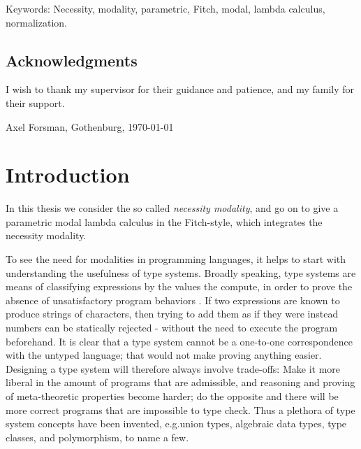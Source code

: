 \documentclass[12pt,twoside,openright]{report}
\numberwithin{equation}{chapter}
\numberwithin{figure}{chapter}
\numberwithin{table}{chapter}
\theoremstyle{definition}\newtheorem{definition}{Definition}
\begin{document}
\vfill
Keywords: Necessity, modality, parametric, Fitch, modal, lambda calculus, normalization.

\newpage
\thispagestyle{empty}
\mbox{}

\newpage
\thispagestyle{plain}
\section*{Acknowledgments}

I wish to thank my supervisor for their guidance and patience,
and my family for their support.

\vspace{1.5cm}\hfill
Axel Forsman, Gothenburg, \today

\newpage
\thispagestyle{empty}
\mbox{}

\newpage
\tableofcontents

\cleardoublepage
{}
\listoffigures

\cleardoublepage
\setcounter{page}{1}

\chapter{Introduction}

In this thesis we consider the so called \emph{necessity modality},
and go on to give a parametric modal lambda calculus in the Fitch-style,
which integrates the necessity modality.

To see the need for modalities in programming languages,
it helps to start with understanding the usefulness of type systems.
Broadly speaking,
type systems are means of classifying expressions by the values the compute,
in order to prove the absence of unsatisfactory program behaviors \cite{pierce02}.
If two expressions are known to produce strings of characters,
then trying to add them as if they were instead numbers
can be statically rejected - without the need to execute the program beforehand.
It is clear that a type system cannot be a one-to-one correspondence
with the untyped language;
that would not make proving anything easier.
Designing a type system will therefore always involve trade-offs:
Make it more liberal in the amount of programs that are admissible,
and reasoning and proving of meta-theoretic properties become harder;
do the opposite and there will be more correct programs
that are impossible to type check.
Thus a plethora of type system concepts have been invented,
e.g.\@ union types, algebraic data types, type classes, and polymorphism, to name a few.
\end{document}
